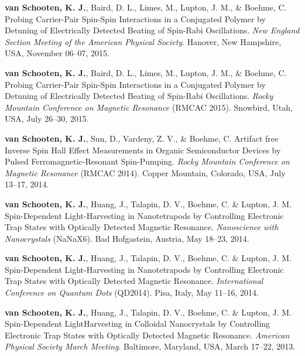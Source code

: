 \documentclass[11pt,letterpaper]{article}
\newcommand{\mhead}[1]{\leavevmode\marginpar{\sffamily\small #1}}
\begin{document}
\mhead{Conference\newline Talks}
\vspace{-1.1em} %
\begin{bibenum}

	\item \textbf{van Schooten, K. J.}, Baird, D. L., Limes, M., Lupton, J. M., \& Boehme, C. Probing Carrier-Pair Spin-Spin Interactions in a Conjugated Polymer by Detuning of Electrically Detected Beating of Spin-Rabi Oscillations. \textit{New England Section Meeting of the American Physical Society}. Hanover, New Hampshire, USA, November 06--07, 2015.

	\item \textbf{van Schooten, K. J.}, Baird, D. L., Limes, M., Lupton, J. M., \& Boehme, C. Probing Carrier-Pair Spin-Spin Interactions in a Conjugated Polymer by Detuning of Electrically Detected Beating of Spin-Rabi Oscillations. \textit{Rocky Mountain Conference on Magnetic Resonance} (RMCAC 2015). Snowbird, Utah, USA, July 26--30, 2015.

	\item \textbf{van Schooten, K. J.}, Sun, D., Vardeny, Z. V., \& Boehme, C. Artifact free Inverse Spin Hall Effect Measurements in Organic Semiconductor Devices by Pulsed Ferromagnetic-Resonant Spin-Pumping. \textit{Rocky Mountain Conference on Magnetic Resonance} (RMCAC 2014). Copper Mountain, Colorado, USA, July 13--17, 2014.

	\item \textbf{van Schooten, K. J.}, Huang, J., Talapin, D. V., Boehme, C. \& Lupton, J. M. Spin-Dependent Light-Harvesting in Nanotetrapods by Controlling Electronic Trap States with Optically Detected Magnetic Resonance. \textit{Nanoscience with Nanocrystals} (NaNaX6). Bad Hofgastein, Austria, May 18--23, 2014.
	
	\item \textbf{van Schooten, K. J.}, Huang, J., Talapin, D. V., Boehme, C. \& Lupton, J. M. Spin-Dependent Light-Harvesting in Nanotetrapods by Controlling Electronic Trap States with Optically Detected Magnetic Resonance. \textit{International Conference on Quantum Dots} (QD2014). Pisa, Italy, May 11--16, 2014.
	
	\item \textbf{van Schooten, K. J.}, Huang, J., Talapin, D. V., Boehme, C. \& Lupton, J. M. Spin-Dependent LightHarvesting in Colloidal Nanocrystals by Controlling Electronic Trap States with Optically Detected Magnetic Resonance. \textit{American Physical Society March Meeting}. Baltimore, Maryland, USA, March 17--22, 2013.
	

\end{bibenum}
\end{document}
